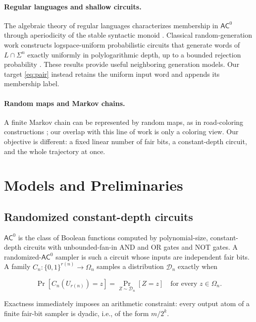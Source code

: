 \documentclass[10pt]{article}
\theoremstyle{definition}
\newcommand{\AC}{\mathsf{AC}}
\newcommand{\bits}{\{0,1\}}
\begin{document}
\paragraph{Regular languages and shallow circuits.}
The algebraic theory of regular languages characterizes membership in
$\AC^0$ through aperiodicity of the stable syntactic monoid
\cite{barrington1992regular}.  Classical random-generation work constructs
logspace-uniform probabilistic circuits that generate words of
$L\cap\Sigma^n$ exactly uniformly in polylogarithmic depth, up to a bounded
rejection probability \cite{goldwurm2001random}.
These results provide useful neighboring generation models.  Our target
\cref{eq:pair} instead retains the uniform input word and appends its
membership label.

\paragraph{Random maps and Markov chains.}
A finite Markov chain can be represented by random maps, as in road-coloring
constructions \cite{yano2010road,jost2015random}; our overlap with this line
of work is only a coloring view.  Our objective is different: a
fixed linear number of fair bits, a constant-depth circuit, and the whole
trajectory at once.

\section{Models and Preliminaries}
\label{sec:model}

\subsection{Randomized constant-depth circuits}

$\AC^0$ is the class of Boolean functions computed by polynomial-size,
constant-depth circuits with unbounded-fan-in AND and OR gates and NOT gates.
A randomized-$\AC^0$ sampler is such a circuit whose inputs are independent
fair bits.  A family $C_n:\bits^{r(n)}\to\Omega_n$ samples a distribution
$\mathcal D_n$ exactly when

\begin{equation}
  \Pr[C_n(U_{r(n)})=z]=\Pr_{Z\sim\mathcal D_n}[Z=z]
  \quad\text{for every }z\in\Omega_n.
\end{equation}

Exactness immediately imposes an arithmetic constraint: every output atom of
a finite fair-bit sampler is dyadic, i.e., of the form $m/2^k$.
\end{document}
